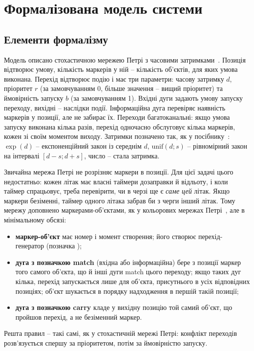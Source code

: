 \section{Формалізована модель системи}

\subsection{Елементи формалізму}

Модель описано стохастичною мережею Петрі з часовими затримками~\cite{stetsenko2010, stetsenko2024}. Позиція відтворює умову, кількість маркерів у ній -- кількість об'єктів, для яких умова виконана. Перехід відтворює подію і має три параметри: часову затримку $d$, пріоритет $r$ (за замовчуванням 0, більше значення -- вищий пріоритет) та ймовірність запуску $b$ (за замовчуванням 1). Вхідні дуги задають умову запуску переходу, вихідні -- наслідки події. Інформаційна дуга перевіряє наявність маркерів у позиції, але не забирає їх. Переходи багатоканальні: якщо умова запуску виконана кілька разів, перехід одночасно обслуговує кілька маркерів, кожен зі своїм моментом виходу. Затримки позначено так, як у посібнику~\cite{stetsenko2024}: $\exp(d)$ -- експоненційний закон із середнім $d$, $\mathrm{unif}(d; s)$ -- рівномірний закон на інтервалі $[d - s; d + s]$, число -- стала затримка.

Звичайна мережа Петрі не розрізняє маркери в позиції. Для цієї задачі цього недостатньо: кожен літак має власні таймери дозаправки й відльоту, і коли таймер спрацьовує, треба перевірити, чи в черзі ще є \emph{саме цей} літак. Якщо маркери безіменні, таймер одного літака забрав би з черги інший літак. Тому мережу доповнено маркерами-об'єктами, як у кольорових мережах Петрі~\cite{jensen2009}, але в мінімальному обсязі:
\begin{itemize}
\item \textbf{маркер-об'єкт} має номер і момент створення; його створює перехід-генератор (позначка );
\item \textbf{дуга з позначкою match} (вхідна або інформаційна) бере з позиції маркер того самого об'єкта, що й інші дуги match цього переходу; якщо таких дуг кілька, перехід запускається лише для об'єкта, присутнього в усіх відповідних позиціях; об'єкт шукається в порядку надходження в першій такій позиції;
\item \textbf{дуга з позначкою carry} кладе у вихідну позицію той самий об'єкт, що пройшов перехід, а не безіменний маркер.
\end{itemize}
Решта правил -- такі самі, як у стохастичній мережі Петрі: конфлікт переходів розв'язується спершу за пріоритетом, потім за ймовірністю запуску.


